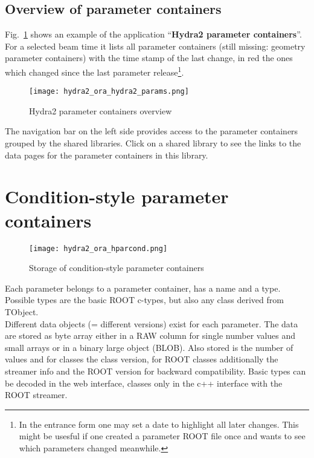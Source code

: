\subsection[Overview of parameter containers]{Overview of parameter containers} \label{sec:oraParameterContainers}

Fig.~\ref{fig:oraHydra2Params} shows an example of the application ``\textbf{Hydra2 parameter containers}''.\\
For a selected beam time it lists all parameter containers (still missing: geometry parameter containers) with the 
time stamp of the last change, in red the ones which changed since the last parameter release\footnote{In the entrance form one 
may set a date to highlight all later changes. This might be usesful if one created a parameter ROOT file once and wants to 
see which parameters changed meanwhile.}.

\begin{figure}[\htb]
  \centering
  \texttt{[image: hydra2\_ora\_hydra2\_params.png]}
  \caption[Hydra2 parameter containers overview]{Hydra2 parameter containers overview}
  \label{fig:oraHydra2Params}
\end{figure}

The navigation bar on the left side provides access to the parameter containers grouped by the shared libraries. Click on a 
shared library to see the links to the data pages for the parameter containers in this library. 


\section[Condition-style parameter containers]{Condition-style parameter containers} \label{sec:oraCondStyle}

\begin{figure}[\htb]
  \centering
  \texttt{[image: hydra2\_ora\_hparcond.png]}
  \caption[Storage of condition-style parameter containers]{Storage of condition-style parameter containers}
  \label{fig:oraCondStyleStorage}
\end{figure}

Each parameter belongs to a parameter container, has a name and a type. Possible types are the basic ROOT c-types, 
but also any class derived from TObject.\\
Different data objects (= different versions) exist for each parameter. The data are stored as byte array either in a RAW 
column for single number values and small arrays or in a binary large object (BLOB). Also stored is the number of values and for 
classes the class version, for ROOT classes additionally the streamer info and the ROOT version for backward compatibility. 
Basic types can be decoded in the web interface, classes only in the c++ interface with the ROOT streamer.\\

